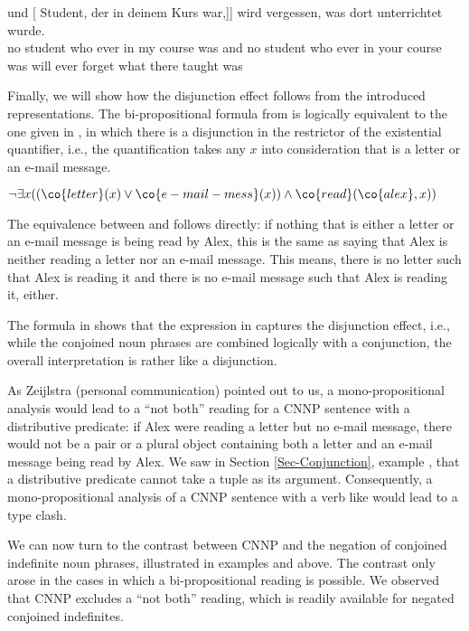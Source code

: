 \documentclass[output=paper]{langsci/langscibook}
\begin{document}
\ea \label{jemals3}
\gll [[\NE{Kein} Student, der \npi{jemals} in meinem Kurs war,] und [ Student, der  in deinem Kurs war,]] wird  vergessen, was dort unterrichtet wurde.\\
\hphantom{[[}no student who ever in my course was and \hphantom{[}no student who ever in your course was will ever forget what there taught was\\
\glt {}
\z 

Finally, we will show how the disjunction effect follows from the introduced representations. 
The bi-propositional formula from  is logically equivalent to the one given in , in which there is a disjunction in the restrictor of the existential quantifier, i.e., the quantification takes any $x$ into consideration that is a letter or an e-mail message.


\ea \label{alex-cnnp-lf3a}
$\lnot \exists x ((\co{letter}(x) \lor \co{e-mail-mess}(x)) \land \co{read}(\co{alex},x))$
\z\largerpage

The equivalence between  and  follows directly: if nothing that is either a letter or an e-mail message is being read by Alex, this is the same as saying that Alex is neither reading a letter nor an e-mail message. This means, there is no letter such that Alex is reading it and there is no e-mail message such that Alex is reading it, either.

The formula in  shows that the expression in  captures the disjunction effect, i.e., while the conjoined noun phrases are combined logically with a conjunction, the overall interpretation is rather like a disjunction. 

As Zeijlstra (personal communication) pointed out to us, a mono-pro\-po\-si\-tional analysis would lead to a ``not both'' reading for a CNNP sentence with a distributive predicate: if Alex were reading a letter but no e-mail message, there would not be a pair or a plural object containing both a letter and an e-mail message being read by Alex. 
We saw in Section \ref{Sec-Conjunction}, example , that a distributive predicate cannot take a tuple as its argument. 
Consequently, a mono-propositional analysis of a CNNP sentence with a verb like  would lead to a type clash.

We can now turn to the contrast between CNNP and the negation of conjoined indefinite noun phrases, illustrated in examples  and  above. 
The contrast only arose in the cases in which a bi-propositional reading is possible. 
We observed that CNNP excludes a ``not both'' reading, which is readily available for negated conjoined indefinites.
\end{document}

